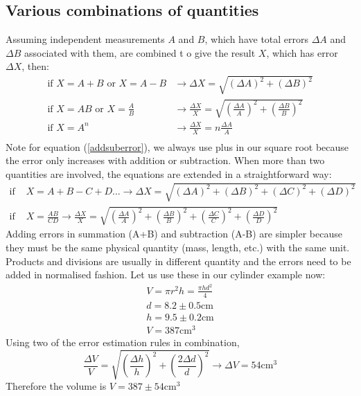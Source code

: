 \subsection{Various combinations of quantities}
Assuming independent measurements $A$ and $B$, which have total errors $\Delta A$ and $\Delta B$ associated with them, are combined t o give the result $X$, which has error $\Delta X$, then:
\begin{align}
  \textrm{if } X = A + B \textrm{ or } X = A - B    & \longrightarrow \Delta X = \sqrt{(\Delta A)^2 + (\Delta B)^2}                                                     \\ \label{addsuberror}
  \textrm{if } X = AB \textrm{ or } X = \frac{A}{B} & \longrightarrow \frac{\Delta X}{X} = \sqrt{\left(\frac{\Delta A}{A}\right)^2 + \left(\frac{\Delta B}{B}\right)^2} \\
  \textrm{if } X = A^n                              & \longrightarrow \frac{\Delta X}{X} = n \frac{\Delta A}{A}                                                         \\
\end{align}
Note for equation (\ref{addsuberror}), we always use plus in our square root because the error only increases with addition or subtraction. When more than two quantities are involved, the equations are extended in a straightforward way:
\begin{align}
  \textrm{if } & X = A + B - C + D ... \longrightarrow \Delta X = \sqrt{(\Delta A)^2 + (\Delta B)^2 + (\Delta C)^2 + (\Delta D)^2}                                                                                           \\
  \textrm{if } & X = \frac{AB}{CD} \longrightarrow \frac{\Delta X}{X} = \sqrt{\left(\frac{\Delta A}{A}\right)^2 + \left(\frac{\Delta B}{B}\right)^2 + \left(\frac{\Delta C}{C}\right)^2 + \left(\frac{\Delta D}{D}\right)^2}
\end{align}
Adding errors in summation (A+B) and subtraction (A-B) are simpler because they must be the same physical quantity (mass, length, etc.) with the same unit. Products and divisions are usually in different quantity and the errors need to be added in normalised fashion. Let us use these in our cylinder example now:
\begin{gather}
  V = \pi r^2 h = \frac{\pi h d^2}{4}\\
  d = 8.2 \pm 0.5 \si{\centi\meter}\\
  h = 9.5 \pm 0.2 \si{\centi\meter}\\
  V = 387 \si{\centi\meter\cubed}
\end{gather}
Using two of the error estimation rules in combination,
\begin{equation}
  \frac{\Delta V}{V} = \sqrt{\left(\frac{\Delta h}{h}\right)^2 + \left(\frac{2\Delta d}{d}\right)^2} \longrightarrow \Delta V = 54 \si{\centi\meter\cubed}
\end{equation}
Therefore the volume is $V = 387 \pm 54 \si{\centi\meter\cubed}$

